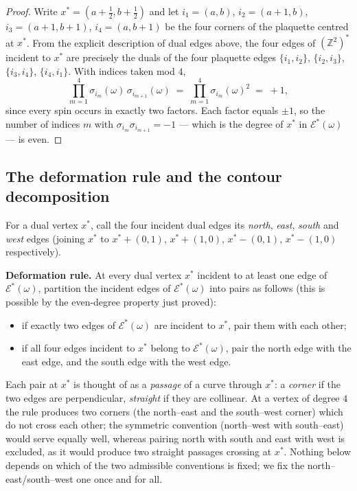 \documentclass[11pt]{article}
\theoremstyle{plain}
\theoremstyle{definition}
\theoremstyle{remark}
\newcommand{\Z}{\mathbb{Z}}
\newcommand{\sg}{\sigma}
\newcommand{\dualZ}{(\Z^2)^*}       %
\newcommand{\dedges}{\mathscr{E}^*} %
\begin{document}
\begin{proof}
Write $x^*=(a+\tfrac12,b+\tfrac12)$ and let $i_1=(a,b)$, $i_2=(a+1,b)$,
$i_3=(a+1,b+1)$, $i_4=(a,b+1)$ be the four corners of the plaquette centred
at $x^*$. From the explicit description of dual edges above, the four edges
of $\dualZ$ incident to $x^*$ are precisely the duals of the four plaquette
edges $\{i_1,i_2\}$, $\{i_2,i_3\}$, $\{i_3,i_4\}$, $\{i_4,i_1\}$. With
indices taken mod $4$,
\[
  \prod_{m=1}^{4}\sg_{i_m}(\omega)\,\sg_{i_{m+1}}(\omega)
  \;=\;\prod_{m=1}^{4}\sg_{i_m}(\omega)^2\;=\;+1,
\]
since every spin occurs in exactly two factors. Each factor equals $\pm1$,
so the number of indices $m$ with $\sg_{i_m}\sg_{i_{m+1}}=-1$ --- which is
the degree of $x^*$ in $\dedges(\omega)$ --- is even.
\end{proof}

\subsection{The deformation rule and the contour decomposition}

For a dual vertex $x^*$, call the four incident dual edges its \emph{north},
\emph{east}, \emph{south} and \emph{west} edges (joining $x^*$ to
$x^*+(0,1)$, $x^*+(1,0)$, $x^*-(0,1)$, $x^*-(1,0)$ respectively).

\medskip\noindent\textbf{Deformation rule.}
At every dual vertex $x^*$ incident to at least one edge of
$\dedges(\omega)$, partition the incident edges of $\dedges(\omega)$ into
pairs as follows (this is possible by the even-degree property just proved):
\begin{itemize}
  \item if exactly two edges of $\dedges(\omega)$ are incident to $x^*$,
        pair them with each other;
  \item if all four edges incident to $x^*$ belong to $\dedges(\omega)$,
        pair the north edge with the east edge, and the south edge with the
        west edge.
\end{itemize}
Each pair at $x^*$ is thought of as a \emph{passage} of a curve through
$x^*$: a \emph{corner} if the two edges are perpendicular, \emph{straight}
if they are collinear. At a vertex of degree $4$ the rule produces two
corners (the north--east and the south--west corner) which do not cross each
other; the symmetric convention (north--west with south--east) would serve
equally well, whereas pairing north with south and east with west is
excluded, as it would produce two straight passages crossing at $x^*$.
Nothing below depends on which of the two admissible conventions is fixed;
we fix the north--east/south--west one once and for all.
\end{document}
